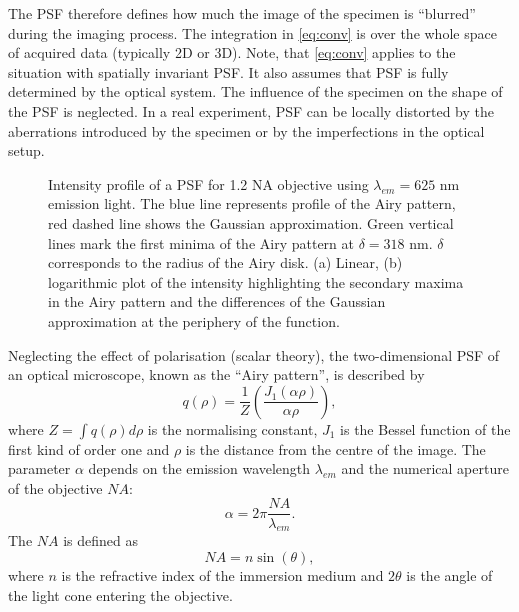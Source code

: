 The PSF therefore defines how much the image of the specimen is ``blurred'' during the imaging process. The integration in \autoref{eq:conv} is over the whole space of acquired data (typically 2D or 3D). Note, that \autoref{eq:conv} applies to the situation with spatially invariant PSF. It also assumes that PSF is fully determined by the optical system. The influence of the specimen on the shape of the PSF is neglected. In a real experiment, PSF can be locally distorted by the aberrations introduced by the specimen or by the imperfections in the optical setup.

\begin{figure}[!bht]
	\centering
	\newcommand{\wf}{.48\textwidth}
	\caption{Intensity profile of a PSF for 1.2 NA objective using $\lambda_{em}=625$ nm emission light. The blue line represents profile of the Airy pattern, red dashed line shows the Gaussian approximation. Green vertical lines mark the first minima of the Airy pattern at $\delta=318$ nm. $\delta$ corresponds to the radius of the Airy disk. (a) Linear, (b) logarithmic plot of the intensity highlighting the secondary maxima in the Airy pattern and the differences of the Gaussian approximation at the periphery of the function.}
	\label{fig:PSF}
\end{figure}
%
Neglecting the effect of polarisation (scalar theory), the two-dimensional PSF of an optical microscope, known as the ``Airy pattern'', is described by
%
\begin{equation}
	q(\rho)=\frac{1}{Z}\left(\frac{J_1(\alpha \rho)}{\alpha \rho}\right),
\end{equation}
%
where $Z=\int q(\rho) d\rho$ is the normalising constant, $J_1$ is the Bessel function of the first kind of order one and $\rho$ is the distance from the centre of the image. The parameter $\alpha$ depends on the emission wavelength $\lambda_{em}$ and the numerical aperture of the objective $\unit{NA}$:
%
\begin{equation}
	\alpha=2\pi\frac{\unit{NA}}{\lambda_{em}}.
\end{equation}
% 
The $\unit{NA}$ is defined as
\begin{equation}
	\unit{NA}=n\sin(\theta),
	\label{eq:NA}
\end{equation}
%
where $n$ is the refractive index of the immersion medium and $2\theta$ is the angle of the light cone entering the objective.

